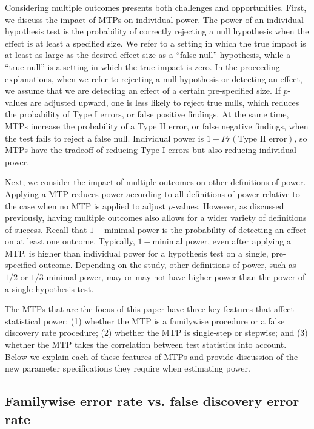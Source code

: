 \documentclass[
]{article}
\begin{document}
Considering multiple outcomes presents both challenges and
opportunities. First, we discuss the impact of MTPs on individual power.
The power of an individual hypothesis test is the probability of
correctly rejecting a null hypothesis when the effect is at least a
specified size. We refer to a setting in which the true impact is at
least as large as the desired effect size as a ``false null''
hypothesis, while a ``true null'' is a setting in which the true impact
is zero. In the proceeding explanations, when we refer to rejecting a
null hypothesis or detecting an effect, we assume that we are detecting
an effect of a certain pre-specified size. If \(p\)-values are adjusted
upward, one is less likely to reject true nulls, which reduces the
probability of Type I errors, or false positive findings. At the same
time, MTPs increase the probability of a Type II error, or false
negative findings, when the test fails to reject a false null.
Individual power is \(1 - Pr(\text{Type II error})\), so MTPs have the
tradeoff of reducing Type I errors but also reducing individual power.

Next, we consider the impact of multiple outcomes on other definitions
of power. Applying a MTP reduces power according to all definitions of
power relative to the case when no MTP is applied to adjust
\(p\)-values. However, as discussed previously, having multiple outcomes
also allows for a wider variety of definitions of success. Recall that
\(1-\)minimal power is the probability of detecting an effect on at
least one outcome. Typically, \(1-\)minimal power, even after applying a
MTP, is higher than individual power for a hypothesis test on a single,
pre-specified outcome. Depending on the study, other definitions of
power, such as \(1/2\) or \(1/3\)-minimal power, may or may not have
higher power than the power of a single hypothesis test.

The MTPs that are the focus of this paper have three key features that
affect statistical power: (1) whether the MTP is a familywise procedure
or a false discovery rate procedure; (2) whether the MTP is single-step
or stepwise; and (3) whether the MTP takes the correlation between test
statistics into account. Below we explain each of these features of MTPs
and provide discussion of the new parameter specifications they require
when estimating power.

\subsection{Familywise error rate vs. false discovery error rate}
\end{document}
